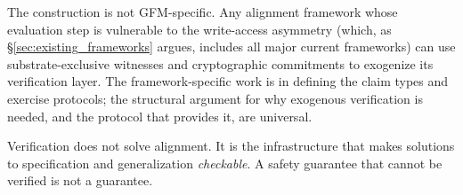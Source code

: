 The construction is not GFM-specific.  Any alignment framework whose
evaluation step is vulnerable to the write-access asymmetry (which, as
\S\ref{sec:existing_frameworks} argues, includes all major current
frameworks) can use substrate-exclusive witnesses and cryptographic
commitments to exogenize its verification layer.  The framework-specific
work is in defining the claim types and exercise protocols; the
structural argument for why exogenous verification is needed, and the
protocol that provides it, are universal.

Verification does not solve alignment.  It is the infrastructure
that makes solutions to specification and generalization
\emph{checkable}.  A safety guarantee that cannot be verified is not a
guarantee.
